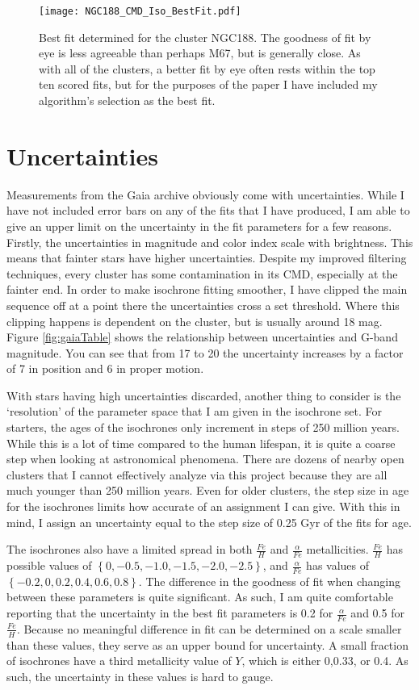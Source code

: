 \documentclass[aps,prb,twocolumn,groupedaddress,nofootinbib,floatfix]{revtex4-1}
\begin{document}
\begin{figure}[!h]
	\centering
      \texttt{[image: NGC188\_CMD\_Iso\_BestFit.pdf]}
	\caption{Best fit determined for the cluster NGC188. The goodness of fit by eye is less agreeable than perhaps M67, but is generally close. As with all of the clusters, a better fit by eye often rests within the top ten scored fits, but for the purposes of the paper I have included my algorithm's selection as the best fit.}
	\label{fig:NGC188_iso_best_fit}
\end{figure}  

\section*{Uncertainties}
Measurements from the Gaia archive obviously come with uncertainties. While I have not included error bars on any of the fits that I have produced, I am able to give an upper limit on the uncertainty in the fit parameters for a few reasons. Firstly, the uncertainties in magnitude and color index scale with brightness. This means that fainter stars have higher uncertainties. Despite my improved filtering techniques, every cluster has some contamination in its CMD, especially at the fainter end. In order to make isochrone fitting smoother, I have clipped the main sequence off at a point there the uncertainties cross a set threshold. Where this clipping happens is dependent on the cluster, but is usually around 18 mag. Figure \ref{fig:gaiaTable} shows the relationship between uncertainties and G-band magnitude. You can see that from 17 to 20 the uncertainty increases by a factor of 7 in position and 6 in proper motion.

With stars having high uncertainties discarded, another thing to consider is the `resolution' of the parameter space that I am given in the isochrone set. For starters, the ages of the isochrones only increment in steps of 250 million years. While this is a lot of time compared to the human lifespan, it is quite a coarse step when looking at astronomical phenomena. There are dozens of nearby open clusters that I cannot effectively analyze via this project because they are all much younger than 250 million years. Even for older clusters, the step size in age for the isochrones limits how accurate of an assignment I can give. With this in mind, I assign an uncertainty equal to the step size of 0.25 Gyr of the fits for age.

The isochrones also have a limited spread in both $\frac{Fe}{H}$ and $\frac{\alpha}{Fe}$ metallicities. $\frac{Fe}{H}$ has possible values of $\left\{0,-0.5,-1.0,-1.5,-2.0,-2.5\right\}$, and $\frac{\alpha}{Fe}$ has values of $\left\{-0.2,0,0.2,0.4,0.6,0.8\right\}$. The difference in the goodness of fit when changing between these parameters is quite significant. As such, I am quite comfortable reporting that the uncertainty in the best fit parameters is 0.2 for $\frac{\alpha}{Fe}$ and 0.5 for $\frac{Fe}{H}$. Because no meaningful difference in fit can be determined on a scale smaller than these values, they serve as an upper bound for uncertainty. A small fraction of isochrones have a third metallicity value of $Y$, which is either 0,0.33, or 0.4. As such, the uncertainty in these values is hard to gauge.
\end{document}
